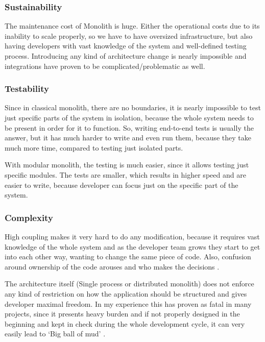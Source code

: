 
\subsubsection{Sustainability}
The maintenance cost of Monolith is huge. Either the operational costs due to its inability to scale properly, so we have to have oversized infrastructure, but also having developers with vast knowledge of the system and well-defined testing process. Introducing any kind of architecture change is nearly impossible and integrations have proven to be complicated/problematic as well.

\subsubsection{Testability}
Since in classical monolith, there are no boundaries, it is nearly impossible to test just specific parts of the system in isolation, because the whole system needs to be present in order for it to function. So, writing end-to-end tests is usually the answer, but it has much harder to write and even run them, because they take much more time, compared to testing just isolated parts.

With modular monolith, the testing is much easier, since it allows testing just specific modules. The tests are smaller, which results in higher speed and are easier to write, because developer can focus just on the specific part of the system.

\subsubsection{Complexity}
High coupling makes it very hard to do any modification, because it requires vast knowledge of the whole system and as the developer team grows they start to get into each other way, wanting to change the same piece of code. Also, confusion around ownership of the code arouses and who makes the decisions \cite{MON_TO_MS_MONOLITH}.

The architecture itself (Single process or distributed monolith) does not enforce any kind of restriction on how the application should be structured and gives developer maximal freedom. In my experience this has proven as fatal in many projects, since it presents heavy burden and if not properly designed in the beginning and kept in check during the whole development cycle, it can very easily lead to `Big ball of mud' \cite{BIG_BALL_OF_MUD}.

